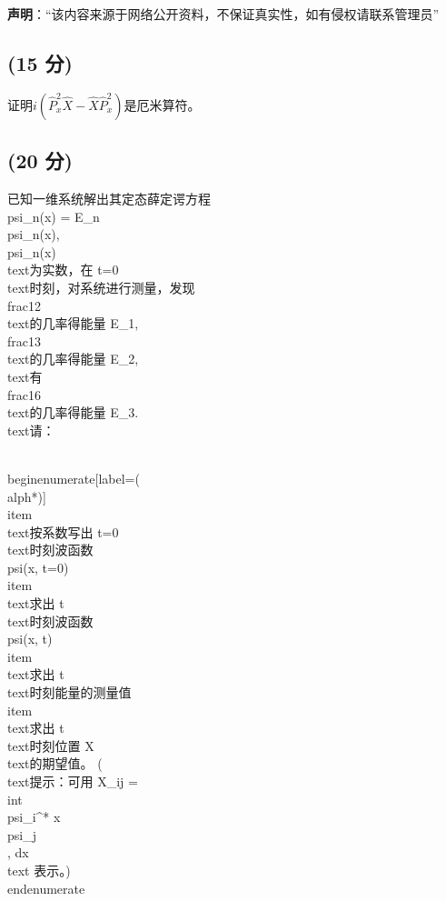 
\textbf{声明}：“该内容来源于网络公开资料，不保证真实性，如有侵权请联系管理员”

\subsection{(15 分)}
证明$i\left(\hat{P}_x^2\hat{X} - \hat{X}\hat{P}_x^2\right)$是厄米算符。
\subsection{(20 分)}
已知一维系统解出其定态薛定谔方程   \\psi_n(x) = E_n \\psi_n(x), \\psi_n(x) \\text{为实数，在 } t=0 \\text{时刻，对系统进行测量，发现 } \\frac{1}{2} \\text{的几率得能量 } E_1, \\frac{1}{3} \\text{的几率得能量 } E_2, \\text{有} \\frac{1}{6} \\text{的几率得能量 } E_3. \\text{请：}

\\begin{enumerate}[label=(\\alph*)]
    \\item \\text{按系数写出 } t=0 \\text{时刻波函数 } \\psi(x, t=0)
    \\item \\text{求出 } t \\text{时刻波函数 } \\psi(x, t)
    \\item \\text{求出 } t \\text{时刻能量的测量值}
    \\item \\text{求出 } t \\text{时刻位置 } X \\text{的期望值。} (\\text{提示：可用 } X_{ij} = \\int \\psi_i^* x \\psi_j \\, dx \\text{ 表示。})
\\end{enumerate}
